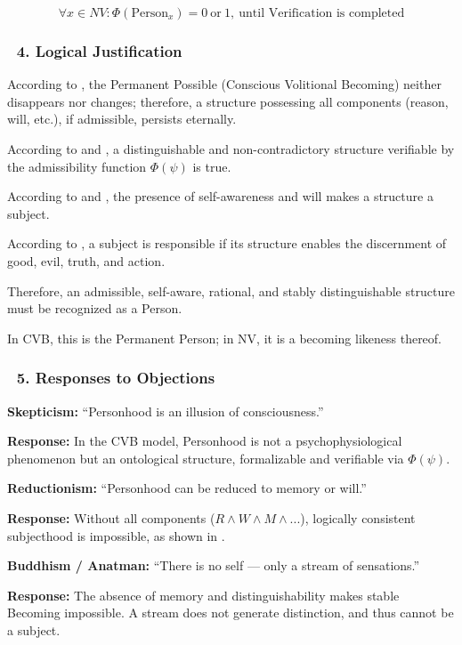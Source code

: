\documentclass[12pt]{article}
\begin{document}
\[
\forall x \in NV: \Phi(\text{Person}_x) = 0\ \text{or}\ 1,\ \text{until Verification is completed}
\]

\subsubsection*{🔹 4. Logical Justification}

According to \text{[4.4]}, the Permanent Possible (Conscious Volitional Becoming) neither disappears nor changes; therefore, a structure possessing all components (reason, will, etc.), if admissible, persists eternally.

According to \text{[5]} and \text{[11.1.1]}, a distinguishable and non-contradictory structure verifiable by the admissibility function $\Phi(\psi)$ is true.

According to \text{[10.5]} and \text{[10.6]}, the presence of self-awareness and will makes a structure a subject.

According to \text{[11.5]}, a subject is responsible if its structure enables the discernment of good, evil, truth, and action.

Therefore, an admissible, self-aware, rational, and stably distinguishable structure must be recognized as a Person.

In CVB, this is the Permanent Person; in NV, it is a becoming likeness thereof.

\subsubsection*{🔹 5. Responses to Objections}

\textbf{Skepticism:} ``Personhood is an illusion of consciousness.''

\textbf{Response:} In the CVB model, Personhood is not a psychophysiological phenomenon but an ontological structure, formalizable and verifiable via $\Phi(\psi)$.

\bigskip

\textbf{Reductionism:} ``Personhood can be reduced to memory or will.''

\textbf{Response:} Without all components ($R\land W\land M\land ...$), logically consistent subjecthood is impossible, as shown in \text{[12.4]}.

\bigskip

\textbf{Buddhism / Anatman:} ``There is no self — only a stream of sensations.''

\textbf{Response:} The absence of memory and distinguishability makes stable Becoming impossible. A stream does not generate distinction, and thus cannot be a subject.
\end{document}
